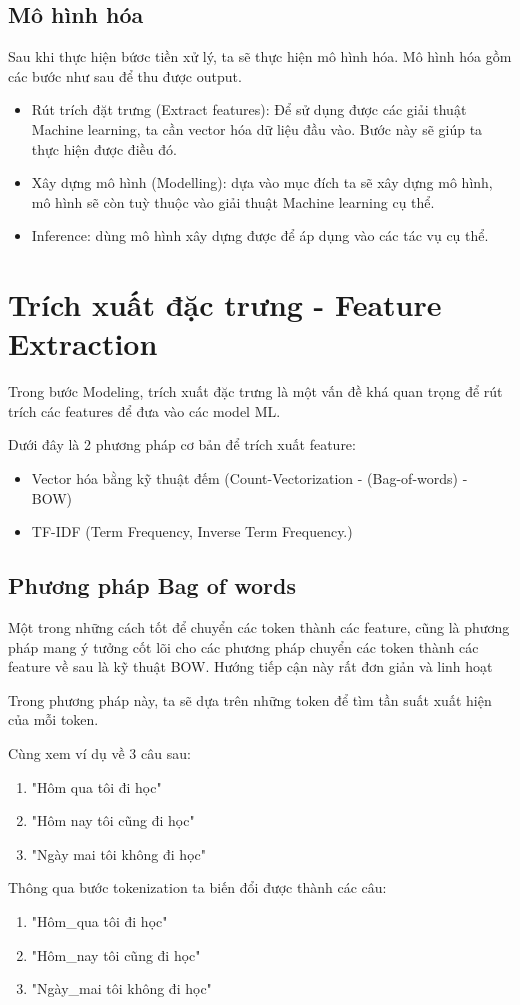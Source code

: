 \subsection{Mô hình hóa}
Sau khi thực hiện bứơc tiền xử lý, ta sẽ thực hiện mô hình hóa. Mô hình hóa gồm các bước như sau để thu được output.

\begin{itemize}
    \item Rút trích đặt trưng (Extract features): Để sử dụng được các giải thuật Machine learning, ta cần vector hóa dữ liệu đầu vào. Bước này sẽ giúp ta thực hiện được điều đó.
    \item Xây dựng mô hình (Modelling): dựa vào mục đích ta sẽ xây dựng mô hình, mô hình sẽ còn tuỳ thuộc vào giải thuật Machine learning cụ thể.
    \item Inference: dùng mô hình xây dựng được để áp dụng vào các tác vụ cụ thể.
\end{itemize}

\section{Trích xuất đặc trưng - Feature Extraction}
Trong bước Modeling, trích xuất đặc trưng là một vấn đề khá quan trọng để rút trích các features để đưa vào các model ML.

Dưới đây là 2 phương pháp cơ bản để trích xuất feature:
\begin{itemize}
    \item Vector hóa bằng kỹ thuật đếm (Count-Vectorization - (Bag-of-words) - BOW)
    \item TF-IDF (Term Frequency, Inverse Term Frequency.)
\end{itemize}

\subsection{Phương pháp Bag of words}
Một trong những cách tốt để chuyển các  token thành các feature, cũng là phương pháp mang ý tưởng cốt lõi cho các phương pháp chuyển các  token thành các feature về sau là kỹ thuật BOW. Hướng tiếp cận này rất đơn giản và linh hoạt

Trong phương pháp này, ta sẽ dựa trên những token để tìm tần suất xuất hiện của mỗi token.

Cùng xem ví dụ về 3 câu sau:
\begin{enumerate}
    \item "Hôm qua tôi đi học"
    \item "Hôm nay tôi cũng đi học"
    \item "Ngày mai tôi không đi học"
\end{enumerate}
Thông qua bước tokenization ta biến đổi được thành các câu:
\begin{enumerate}
    \item "Hôm\_qua tôi đi học"
    \item "Hôm\_nay tôi cũng đi học"
    \item "Ngày\_mai tôi không đi học"
\end{enumerate}

